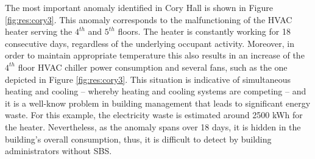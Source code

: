 The most important anomaly identified in Cory Hall is shown in Figure \ref{fig:res:cory3}.
This anomaly corresponds to the malfunctioning of the HVAC heater serving the $4^{th}$ and $5^{th}$ floors. 
The heater is constantly working for 18 consecutive days, regardless of the underlying occupant activity.
Moreover, in order to maintain appropriate temperature this also results in an increase of the $4^{th}$ floor HVAC chiller power consumption 
and several fans, such as the one depicted in Figure \ref{fig:res:cory3}.
This situation is indicative of simultaneous heating and cooling -- whereby heating and cooling systems are competing -- and it 
is a well-know problem in building management that leads to significant energy waste.
For this example, the electricity waste is estimated around 2500 kWh for the heater.
Nevertheless, as the anomaly spans over 18 days, it is hidden in the building's overall consumption, thus, it is difficult to detect 
by building administrators without SBS.

